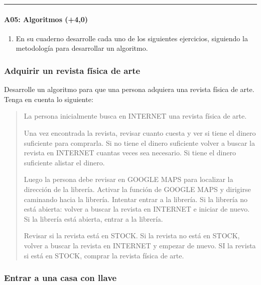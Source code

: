 \documentclass[letterpaper,10pt,spanish]{sphinxmanual}
\begin{document}
\bigskip\hrule\bigskip



\paragraph{A05: Algoritmos (+4,0)}
\label{\detokenize{cursos/ofimatica11/periodo01/G03:a05-algoritmos-4-0}}
\sphinxAtStartPar
{}
\begin{enumerate}
%
\item {} 
\sphinxAtStartPar
En su cuaderno desarrolle cada uno de los siguientes ejercicios, siguiendo la metodología para desarrollar un algoritmo.

\end{enumerate}
\subsubsection*{Adquirir un revista física de arte}

\sphinxAtStartPar
Desarrolle un algoritmo para que una persona adquiera una revista física de arte. Tenga en cuenta lo siguiente:
\begin{quote}

\sphinxAtStartPar
La persona inicialmente busca en INTERNET una revista física de arte.

\sphinxAtStartPar
Una vez encontrada la revista, revisar cuanto cuesta y ver si tiene el dinero suficiente para comprarla. Si no tiene el dinero suficiente volver a buscar la revista en INTERNET cuantas veces sea necesario. Si tiene el dinero suficiente alistar el dinero.

\sphinxAtStartPar
Luego la persona debe revisar en GOOGLE MAPS para localizar la dirección de la librería. Activar la función de GOOGLE MAPS y dirigirse caminando hacia la librería. Intentar entrar a la librería. Si la librería no está abierta: volver a buscar la revista en INTERNET e iniciar de nuevo. Si la librería está abierta, entrar a la librería.

\sphinxAtStartPar
Revisar si la revista está en STOCK. Si la revista no está en STOCK, volver a buscar la revista en INTERNET y empezar de nuevo. SI la revista si está en STOCK, comprar la revista física de arte.
\end{quote}
\subsubsection*{Entrar a una casa con llave}
\end{document}
